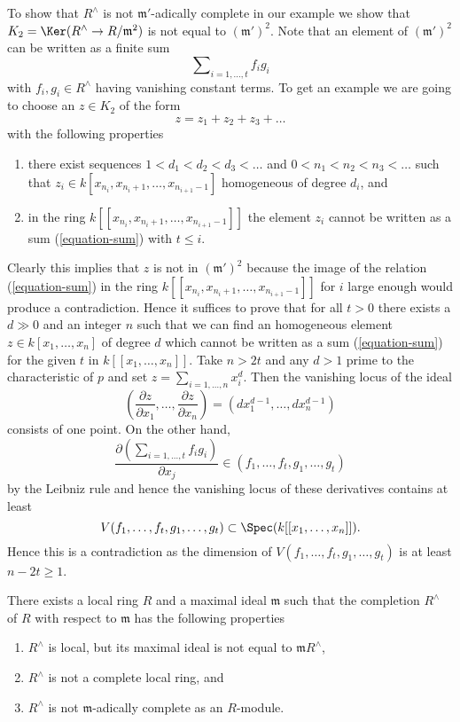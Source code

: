 \medskip\noindent
To show that $R^\wedge$ is not $\mathfrak m'$-adically complete
in our example we show that $K_2 = \Ker(R^\wedge \to R/\mathfrak m^2)$
is not equal to $(\mathfrak m')^2$.
Note that an element of $(\mathfrak m')^2$
can be written as a finite sum
\begin{equation}
\label{equation-sum}
\sum\nolimits_{i = 1, \ldots, t} f_i g_i
\end{equation}
with $f_i, g_i \in R^\wedge$ having vanishing constant terms.
To get an example we are going to choose an $z \in K_2$
of the form
$$
z = z_1 + z_2 + z_3 + \ldots
$$
with the following properties
\begin{enumerate}
\item there exist sequences $1 < d_1 < d_2 < d_3 < \ldots $ and
$0 < n_1 < n_2 < n_3 < \ldots$ such that
$z_i \in k[x_{n_i}, x_{n_i + 1}, \ldots, x_{n_{i + 1} - 1}]$
homogeneous of degree $d_i$, and
\item in the ring $k[[x_{n_i}, x_{n_i + 1}, \ldots, x_{n_{i + 1} - 1}]]$
the element $z_i$ cannot be written as a sum (\ref{equation-sum})
with $t \leq i$.
\end{enumerate}
Clearly this implies that $z$ is not in $(\mathfrak m')^2$
because the image of the relation (\ref{equation-sum}) in the
ring $k[[x_{n_i}, x_{n_i + 1}, \ldots, x_{n_{i + 1} - 1}]]$
for $i$ large enough would produce a contradiction. Hence it suffices
to prove that for all $t > 0$ there exists a $d \gg 0$ and an integer
$n$ such that we can find an homogeneous element
$z \in k[x_1, \ldots, x_n]$ of degree $d$ which cannot be written as
a sum (\ref{equation-sum}) for the given $t$ in $k[[x_1, \ldots, x_n]]$.
Take $n > 2t$ and any $d > 1$ prime to the characteristic of $p$ and
set $z = \sum_{i = 1, \ldots, n} x_i^d$. Then the vanishing locus
of the ideal
$$
(\frac{\partial z}{\partial x_1}, \ldots, \frac{\partial z}{\partial x_n})
=
(dx_1^{d - 1}, \ldots, dx_n^{d - 1})
$$
consists of one point. On the other hand,
$$
\frac{\partial ( \sum\nolimits_{i = 1, \ldots, t} f_i g_i ) }{\partial x_j}
\in (f_1, \ldots, f_t, g_1, \ldots, g_t)
$$
by the Leibniz rule and hence the vanishing locus of these derivatives
contains at least
$$
V(f_1, \ldots, f_t, g_1, \ldots, g_t) \subset
\Spec(k[[x_1, \ldots, x_n]]).
$$
Hence this is a contradiction as the dimension of
$V(f_1, \ldots, f_t, g_1, \ldots, g_t)$ is at least $n - 2t \geq 1$.

\begin{lemma}
\label{lemma-noncomplete-completion}
There exists a local ring $R$ and a maximal ideal $\mathfrak m$ such that
the completion $R^\wedge$ of $R$ with respect to $\mathfrak m$ has the
following properties
\begin{enumerate}
\item $R^\wedge$ is local, but its maximal ideal is not equal to
$\mathfrak m R^\wedge$,
\item $R^\wedge$ is not a complete local ring, and
\item $R^\wedge$ is not $\mathfrak m$-adically complete as an $R$-module.
\end{enumerate}
\end{lemma}

